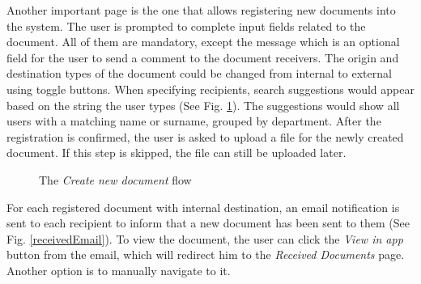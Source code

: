Another important page is the one that allows registering new documents into the system. The user is prompted to complete input fields related to the document. All of them are mandatory, except the message which is an optional field for the user to send a comment to the document receivers. The origin and destination types of the document could be changed from internal to external using toggle buttons. When specifying recipients, search suggestions would appear based on the string the user types (See Fig. \ref{createDocument}). The suggestions would show all users with a matching name or surname, grouped by department. After the registration is confirmed, the user is asked to upload a file for the newly created document. If this step is skipped, the file can still be uploaded later.

\begin{figure}[ht]
    \centering
    \qquad
    \caption{The \textit{Create new document} flow}
    \label{createDocument}
\end{figure}

For each registered document with internal destination, an email notification is sent to each recipient to inform that a new document has been sent to them (See Fig. \ref{receivedEmail}). To view the document, the user can click the \textit{View in app} button from the email, which will redirect him to the \textit{Received Documents} page. Another option is to manually navigate to it.

